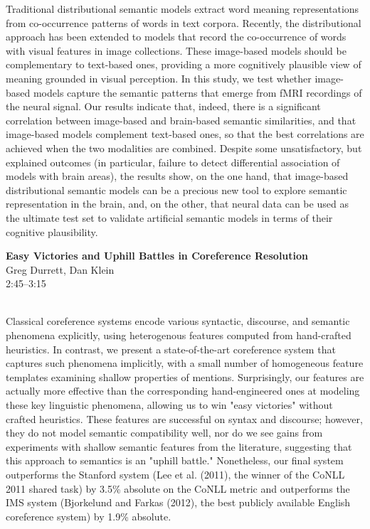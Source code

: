 \documentclass[twoside,makeidx]{book}
\begin{document}
\nopagebreak%
\noindent%
{\small Traditional distributional semantic models extract word meaning   representations from co-occurrence patterns of words in text   corpora. Recently, the distributional approach has been extended to   models that record the co-occurrence of words with visual features   in image collections. These image-based models should be   complementary to text-based ones, providing a more cognitively   plausible view of meaning grounded in visual perception. In this   study, we test whether image-based models capture the semantic   patterns that emerge from fMRI recordings of the neural signal. Our   results indicate that, indeed, there is a significant correlation   between image-based and brain-based semantic similarities, and that   image-based models complement text-based ones, so that the best   correlations are achieved when the two modalities are   combined. Despite some unsatisfactory, but explained outcomes (in particular,   failure to detect differential association of models with brain   areas), the results show, on the one hand, that image-based   distributional semantic models can be a precious new tool to explore   semantic representation in the brain, and, on the other, that neural   data can be used as the ultimate test set to validate artificial   semantic models in terms of their cognitive plausibility.}
\par\vspace{2em}\noindent%
\begin{minipage}{\linewidth}%
\begin{center}
\textbf{\normalsize Easy Victories and Uphill Battles in Coreference Resolution}\\
\normalsize  Greg Durrett,  Dan Klein\\
{\small 2:45--3:15}\\
\end{center}
\end{minipage}\\[0.5em]
\nopagebreak%
\noindent%
{\small Classical coreference systems encode various syntactic, discourse, and semantic phenomena explicitly, using heterogenous features computed from hand-crafted heuristics.  In contrast, we present a state-of-the-art coreference system that captures such phenomena implicitly, with a small number of homogeneous feature templates examining shallow properties of mentions.  Surprisingly, our features are actually more effective than the corresponding hand-engineered ones at modeling these key linguistic phenomena, allowing us to win "easy victories" without crafted heuristics. These features are successful on syntax and discourse; however, they do not model semantic compatibility well, nor do we see gains from experiments with shallow semantic features from the literature, suggesting that this approach to semantics is an "uphill battle." Nonetheless, our final system outperforms the Stanford system (Lee et al. (2011), the winner of the CoNLL 2011 shared task) by 3.5\% absolute on the CoNLL metric and outperforms the IMS system (Bjorkelund and Farkas (2012), the best publicly available English coreference system) by 1.9\% absolute.}
\clearpage
\end{document}
